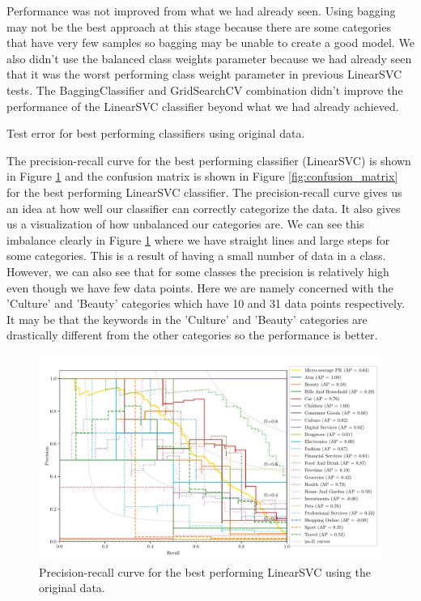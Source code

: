 Performance was not improved from what we had already seen. Using bagging may not be the best approach at this stage because there are some categories that have very few samples so bagging may be unable to create a good model. We also didn't use the balanced class weights parameter because we had already seen that it was the worst performing class weight parameter in previous LinearSVC tests. The BaggingClassifier and GridSearchCV combination didn't improve the performance of the LinearSVC classifier beyond what we had already achieved.

\begin{table}[ht]
\centering
\caption{Test error for best performing classifiers using original data.}

\label{tab:best_errors}
\end{table}

The precision-recall curve for the best performing classifier (LinearSVC) is shown in Figure \ref{fig:pr_curve} and the confusion matrix is shown in Figure \ref{fig:confusion_matrix} for the best performing LinearSVC classifier. The precision-recall curve gives us an idea at how well our classifier can correctly categorize the data. It also gives us a visualization of how unbalanced our categories are. We can see this imbalance clearly in Figure \ref{fig:pr_curve} where we have straight lines and large steps for some categories. This is a result of having a small number of data in a class. However, we can also see that for some classes the precision is relatively high even though we have few data points. Here we are namely concerned with the 'Culture' and 'Beauty' categories which have 10 and 31 data points respectively. It may be that the keywords in the 'Culture' and 'Beauty' categories are drastically different from the other categories so the performance is better. 

\begin{figure}[ht]
  \centering
  \includegraphics[width=\scale\textwidth]{../img/plot_pr_curve.pdf}
  \caption{Precision-recall curve for the best performing LinearSVC using the original data.}
  \label{fig:pr_curve}
\end{figure}

